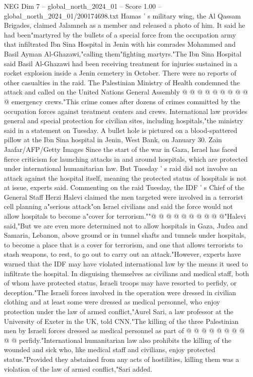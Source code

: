 \begin{textsample}{NEG Dim 7 – global\_north\_2024\_01 – Score 1.00 – global\_north\_2024\_01/200174698.txt}
Hamas ' s military wing, the Al Qassam Brigades, claimed Jalamneh as a member and released a photo of him.
It said he had been"martyred by the bullets of a special force from the occupation army that infiltrated Ibn Sina Hospital in Jenin with his comrades Mohammed and Basil Ayman Al-Ghazawi,"calling them"fighting martyrs."The Ibn Sina Hospital said Basil Al-Ghazawi had been receiving treatment for injuries sustained in a rocket explosion inside a Jenin cemetery in October.
There were no reports of other casualties in the raid.
The Palestinian Ministry of Health condemned the attack and called on the United Nations General Assembly @ @ @ @ @ @ @ @ @ @ emergency crews."This crime comes after dozens of crimes committed by the occupation forces against treatment centers and crews.
International law provides general and special protection for civilian sites, including hospitals,"the ministry said in a statement on Tuesday.
A bullet hole is pictured on a blood-spattered pillow at the Ibn Sina hospital in Jenin, West Bank, on January 30.
Zain Jaafar/AFP/Getty Images Since the start of the war in Gaza, Israel has faced fierce criticism for launching attacks in and around hospitals, which are protected under international humanitarian law.
But Tuesday ' s raid did not involve an attack against the hospital itself, meaning the protected status of hospitals is not at issue, experts said.
Commenting on the raid Tuesday, the IDF ' s Chief of the General Staff Herzi Halevi claimed the men targeted were involved in a terrorist cell planning a"serious attack"on Israel civilians and said the force would not allow hospitals to become a"cover for terrorism.""@ @ @ @ @ @ @ @ @ @"Halevi said,"But we are even more determined not to allow hospitals in Gaza, Judea and Samaria, Lebanon, above ground or in tunnel shafts and tunnels under hospitals, to become a place that is a cover for terrorism, and one that allows terrorists to stash weapons, to rest, to go out to carry out an attack."However, experts have warned that the IDF may have violated international law by the means it used to infiltrate the hospital.
In disguising themselves as civilians and medical staff, both of whom have protected status, Israeli troops may have resorted to perfidy, or deception."The Israeli forces involved in the operation were dressed in civilian clothing and at least some were dressed as medical personnel, who enjoy protection under the law of armed conflict,"Aurel Sari, a law professor at the University of Exeter in the UK, told CNN."The killing of the three Palestinian men by Israeli forces dressed as medical personnel as part of @ @ @ @ @ @ @ @ @ @ perfidy."International humanitarian law also prohibits the killing of the wounded and sick who, like medical staff and civilians, enjoy protected status."Provided they abstained from any acts of hostilities, killing them was a violation of the law of armed conflict,"Sari added.

\end{textsample}
